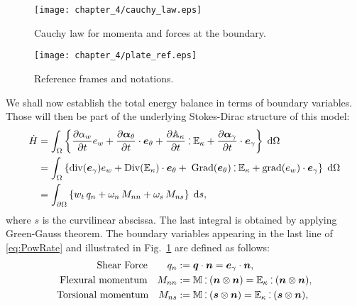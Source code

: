 \begin{figure}[t]
	\centering
	\texttt{[image: chapter\_4/cauchy\_law.eps]}
	\caption{Cauchy law for momenta and forces at the boundary.}
	\label{fig:Cauchy_law}
\end{figure}
\begin{figure}[t]
	\centering
	\texttt{[image: chapter\_4/plate\_ref.eps]}
	\caption{Reference frames and notations.}
	\label{fig:plate_ref}
\end{figure}
{
	We shall now establish the total energy balance in terms of boundary variables. Those will then be part of the underlying Stokes-Dirac structure of this model:
	\begin{equation}
	\label{eq:PowRate}
	\begin{aligned}
	\dot{H}&= \int_{\Omega} \left\{ \diffp{\alpha_w}{t} e_w  + \diffp{\bm\alpha_\theta}{t} \cdot \bm{e}_\theta + \diffp{\mathbb{A}_{\kappa}}{t} \cddot \mathbb{E}_{\kappa}  + \diffp{\bm\alpha_{\gamma}}{t} \cdot \bm{e}_{\gamma} \right\} \d\Omega\\
	&= \int_{\Omega} \left\{ \mathrm{div}(\bm{e}_{\gamma}) e_w  + \mathrm{Div}(\mathbb{E}_{\kappa}) \cdot \bm{e}_\theta + \; \mathrm{Grad}(\bm{e}_{\theta}) \cddot \mathbb{E}_{\kappa}  + \mathrm{grad} (e_w) \cdot \bm{e}_{\gamma} \right\} \d\Omega \\
	&= \int_{\partial \Omega} \left\{ w_t \, q_n  + \omega_n \, M_{nn} + \omega_s \, M_{ns} \right\} \d{s},  \\
	\end{aligned}
	\end{equation}
	where $s$ is the curvilinear abscissa. The last integral is obtained by applying Green-Gauss theorem. The boundary variables appearing in the last line of \eqref{eq:PowRate} and illustrated in Fig.~\ref{fig:Cauchy_law} are defined as follows:
	\begin{equation}
	\label{eq:QnMnnMns}
	\begin{aligned}
	\text{Shear Force}  \qquad q_{n} &:= \bm{q} \cdot \bm{n}=  \bm{e}_{\gamma} \cdot \bm{n},  \\
	\text{Flexural momentum} \quad 
	M_{nn} &:=  \mathbb{M} \cddot (\bm{n}\otimes{\bm{n}}) = \mathbb{E}_{\kappa} \cddot (\bm{n}\otimes{\bm{n}}) 	\\
	\text{Torsional momentum} \quad M_{ns} &:= \mathbb{M} \cddot (\bm{s}\otimes{\bm{n}}) = \mathbb{E}_{\kappa} \cddot (\bm{s}\otimes{\bm{n}}),	
	\end{aligned},
	\end{equation}
}
